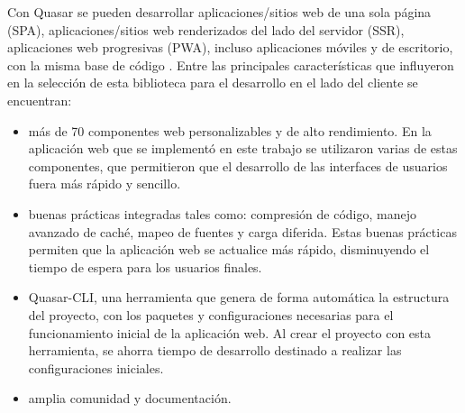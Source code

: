 Con Quasar se pueden desarrollar aplicaciones/sitios web de una sola página (SPA),
aplicaciones/sitios web renderizados del lado del servidor (SSR),
aplicaciones web progresivas (PWA), incluso aplicaciones móviles y de 
escritorio, con la misma base de código \cite{quasar}.
Entre las principales características que influyeron en la selección de esta biblioteca 
para el desarrollo en el lado del cliente se encuentran: 

\begin{itemize}
    \item más de 70 componentes web personalizables y de alto rendimiento. En la aplicación web que se implementó en este trabajo 
    se utilizaron varias de estas componentes, que permitieron que el desarrollo de las interfaces de usuarios fuera más rápido y sencillo.
    \item buenas prácticas integradas tales como: compresión de código, 
    manejo avanzado de caché, mapeo de fuentes y carga diferida. Estas 
    buenas prácticas permiten que la aplicación web se actualice más rápido,
    disminuyendo el tiempo de espera para los usuarios finales.
    
    \item Quasar-CLI, una herramienta que genera de forma automática la estructura del 
    proyecto, con los paquetes y configuraciones necesarias para el 
    funcionamiento inicial de la aplicación web. Al crear el proyecto con esta herramienta,
    se ahorra tiempo de desarrollo destinado a realizar las configuraciones iniciales.

    \item amplia comunidad y documentación.
\end{itemize}


